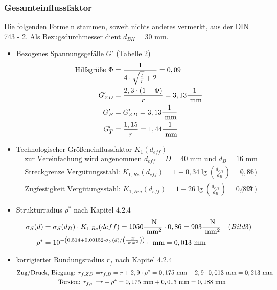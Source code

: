 \subsubsection{Gesamteinflussfaktor}
Die folgenden Formeln stammen, soweit nichts anderes vermerkt, aus der DIN 743 - 2. Als Bezugsdurchmesser dient $d_{BK} = 30$ mm.
\begin{itemize}
\item Bezogenes Spannungsgefälle $G'$ \hfill (Tabelle 2)
	\begin{align*}
	\text{Hilfsgröße } \Phi &= \frac{1}{4 \cdot \sqrt{\frac{t}{r}} +2} = 0,09 \\
	G'_{ZD} &= \frac{2,3 \cdot (1+\Phi)}{r} = 3,13 \frac{1}{\text{ mm}} \\
	G'_{B}&= G'_{ZD}  =3,13 \frac{1}{\text{ mm}} \\
	G'_{T}&= \frac{1,15}{r} = 1,44\frac{1}{\text{ mm}} 
	\end{align*}
\item Technologischer Größeneinflussfaktor $K_1 (d_{eff})$ 
	\begin{align*}
	&\text{zur Vereinfachung wird angenommen } d_{eff} = D =40 \text{ mm und } d_B = 16 \text{ mm} \\ 
	&\text{Streckgrenze Vergütungsstahl: }K_{1,Re}(d_{eff}) = 1 - 0,34 \lg \left( \frac{d_{eff}}{d_B} \right) = 0,86  &(14) \\
	&\text{Zugfestigkeit Vergütungsstahl: } K_{1,Rm}(d_{eff}) = 1 - 26 \lg \left( \frac{d_{eff}}{d_B} \right) = 0,897  &(12) 
	\end{align*}
\item Strukturradius $ \rho ^*$ nach Kapitel 4.2.4
	\begin{align*}
	\sigma_S (d) &= \sigma_S (d_B) \cdot K_{1,Re}(deff) = 1050 \frac{\text{ N}}{\text{ mm}^2} \cdot 0,86 = 903 \frac{\text{ N}}{\text{ mm}^2} &(Bild 3)\\ 
	\rho ^* &=10 ^{-\left(0,514+0,00152\cdot \sigma_S (d) / \left(\frac{\text{ N}}{\text{ mm}^2} \right) \right)} \cdot \text{ mm}= 0,013 \text{ mm}
	\end{align*}
\item korrigierter Rundungsradius $ r_f$ nach Kapitel 4.2.4
	\begin{align*}
	\text{Zug/Druck, Biegung: } r_{f,ZD} =& r_{f,B} = r + 2,9 \cdot \rho ^* = 0,175 \text{ mm} + 2,9 \cdot 0,013 \text{ mm} = 0,213 \text{ mm}\\ 
	\text{Torsion: } r_{f,\tau} =& r +  \rho ^* = 0,175 \text{ mm} + 0,013 \text{ mm} = 0,188\text{ mm}
	\end{align*}

\end{itemize}
